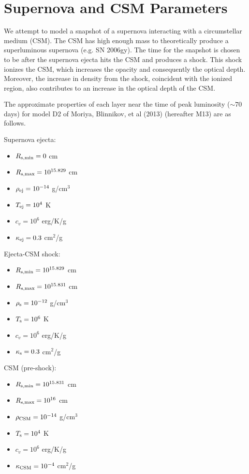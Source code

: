 \documentclass[11pt]{article}
\begin{document}
\section{Supernova and CSM Parameters}
\label{sec:sncsmpars}

We attempt to model a snapshot of a supernova interacting with a circumstellar medium (CSM). The CSM has high enough mass to theoretically produce a superluminous supernova (e.g. SN 2006gy). The time for the snapshot is chosen to be after the supernova ejecta hits the CSM and produces a shock. This shock ionizes the CSM, which increases the opacity and consequently the optical depth. Moreover, the increase in density from the shock, coincident with the ionized region, also contributes to an increase in the optical depth of the CSM.

\vspace{5 mm}

The approximate properties of each layer near the time of peak luminosity ($\sim70$ days) for model D2 of Moriya, Blinnikov, et al (2013) (hereafter M13) are as follows.

\vspace{5 mm}

Supernova ejecta:
\begin{itemize}
\item $R_{\rm s, min} = 0$ cm
\item $R_{\rm s, max} = 10^{15.829}$ cm
\item $\rho_{\rm ej} = 10^{-14}$ g/cm$^3$
\item $T_{\rm ej} = 10^4$ K
\item $c_v = 10^6$ erg/K/g
\item $\kappa_{\rm ej} = 0.3$ cm$^2$/g
\end{itemize}

Ejecta-CSM shock:
\begin{itemize}
\item $R_{\rm s, min} = 10^{15.829}$ cm
\item $R_{\rm s, max} = 10^{15.831}$ cm
\item $\rho_{\rm s} = 10^{-12}$ g/cm$^3$
\item $T_{\rm s} = 10^6$ K
\item $c_v = 10^6$ erg/K/g
\item $\kappa_{\rm s} = 0.3$ cm$^2$/g
\end{itemize}

CSM (pre-shock):
\begin{itemize}
\item $R_{\rm s, min} = 10^{15.831}$ cm
\item $R_{\rm s, max} = 10^{16}$ cm
\item $\rho_{\rm CSM} = 10^{-14}$ g/cm$^3$
\item $T_{\rm s} = 10^4$ K
\item $c_v = 10^6$ erg/K/g
\item $\kappa_{\rm CSM} = 10^{-4}$ cm$^2$/g
\end{itemize}
\end{document}

